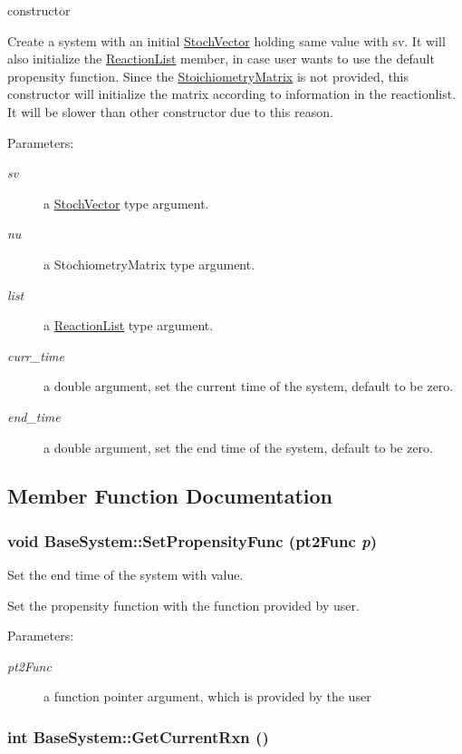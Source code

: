 constructor 

Create a system with an initial \hyperlink{class_stoch_vector}{StochVector} holding same value with sv. It will also initialize the \hyperlink{class_reaction_list}{ReactionList} member, in case user wants to use the default propensity function. Since the \hyperlink{class_stoichiometry_matrix}{StoichiometryMatrix} is not provided, this constructor will initialize the matrix according to information in the reactionlist. It will be slower than other constructor due to this reason.

\begin{Desc}
\item[Parameters:]
\begin{description}
\item[{\em sv}]a \hyperlink{class_stoch_vector}{StochVector} type argument. \item[{\em nu}]a StochiometryMatrix type argument. \item[{\em list}]a \hyperlink{class_reaction_list}{ReactionList} type argument. \item[{\em curr\_\-time}]a double argument, set the current time of the system, default to be zero. \item[{\em end\_\-time}]a double argument, set the end time of the system, default to be zero. \end{description}
\end{Desc}


\subsection{Member Function Documentation}
\hypertarget{class_base_system_8e3cbc98ab5096bd1cb79ece746c2d06}{
\subsubsection{\setlength{\rightskip}{0pt plus 5cm}void BaseSystem::SetPropensityFunc ({\bf pt2Func} {\em p})}}
\label{class_base_system_8e3cbc98ab5096bd1cb79ece746c2d06}


Set the end time of the system with value. 

Set the propensity function with the function provided by user. \begin{Desc}
\item[Parameters:]
\begin{description}
\item[{\em pt2Func}]a function pointer argument, which is provided by the user \end{description}
\end{Desc}
\hypertarget{class_base_system_6e2f63d433e05bd2588e42436503db46}{
\subsubsection{\setlength{\rightskip}{0pt plus 5cm}int BaseSystem::GetCurrentRxn ()}}
\label{class_base_system_6e2f63d433e05bd2588e42436503db46}


